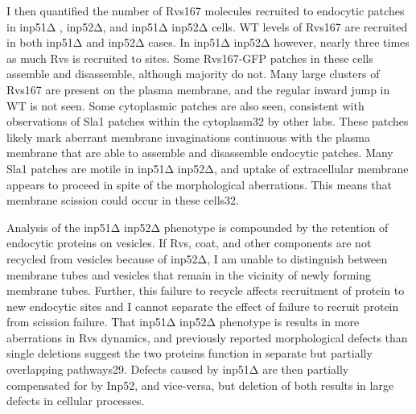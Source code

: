 	
I then quantified the number of Rvs167 molecules recruited to endocytic patches in inp51Δ , inp52Δ, and inp51Δ inp52Δ cells.  WT levels of Rvs167 are recruited in both inp51Δ and inp52Δ cases. In inp51Δ inp52Δ however, nearly three times as much Rvs is recruited to sites. Some Rvs167-GFP patches in these cells assemble and disassemble, although majority do not. Many large clusters of Rvs167 are present on the plasma membrane, and the regular inward jump in WT is not seen. Some cytoplasmic patches are also seen, consistent with observations of Sla1 patches within the cytoplasm32 by other labs. These patches likely mark aberrant membrane invaginations continuous with the plasma membrane that are able to assemble and disassemble endocytic patches. Many Sla1 patches are motile in inp51Δ inp52Δ, and uptake of extracellular membrane appears to proceed in spite of the morphological aberrations. This means that membrane scission could occur in these cells32. 

	\vspace{5mm}
Analysis of the inp51Δ inp52Δ phenotype is compounded by the retention of endocytic proteins on vesicles. If Rvs, coat, and other components are not recycled from vesicles because of inp52Δ, I am unable to distinguish between membrane tubes and vesicles that remain in the vicinity of newly forming membrane tubes. Further, this failure to recycle affects recruitment of protein to new endocytic sites and I cannot separate the effect of failure to recruit protein from scission failure. That inp51Δ inp52Δ phenotype is results in more aberrations in Rvs dynamics, and previously reported morphological defects than single deletions suggest the two proteins function in separate but partially overlapping pathways29. Defects caused by inp51Δ are then partially compensated for by Inp52, and vice-versa, but deletion of both results in large defects in cellular processes.

